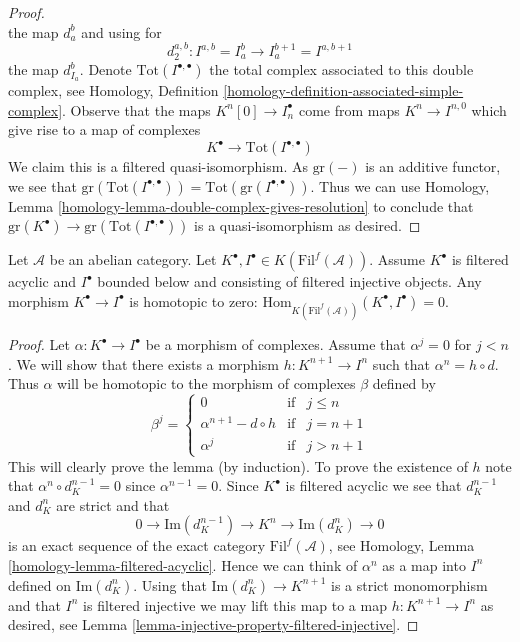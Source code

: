 \begin{proof}
$$$$
the map $d_a^b$ and using for
$$
d_2^{a, b} : I^{a, b} = I_a^b \to I_a^{b + 1} = I^{a, b + 1}
$$
the map $d_{I_a}^b$. Denote $\text{Tot}(I^{\bullet, \bullet})$
the total complex associated to this double complex, see
Homology, Definition \ref{homology-definition-associated-simple-complex}.
Observe that the maps $K^n[0] \to I_n^\bullet$ come from maps
$K^n \to I^{n, 0}$ which give rise to a map of complexes
$$
K^\bullet \longrightarrow \text{Tot}(I^{\bullet, \bullet})
$$
We claim this is a filtered quasi-isomorphism.
As $\text{gr}(-)$ is an additive functor, we see that
$\text{gr}(\text{Tot}(I^{\bullet, \bullet})) =
\text{Tot}(\text{gr}(I^{\bullet, \bullet}))$.
Thus we can use
Homology,
Lemma \ref{homology-lemma-double-complex-gives-resolution}
to conclude that
$\text{gr}(K^\bullet) \to \text{gr}(\text{Tot}(I^{\bullet, \bullet}))$
is a quasi-isomorphism as desired.
\end{proof}

\begin{lemma}
\label{lemma-filtered-acyclic-is-zero}
Let $\mathcal{A}$ be an abelian category.
Let $K^\bullet, I^\bullet \in K(\text{Fil}^f(\mathcal{A}))$.
Assume $K^\bullet$ is filtered acyclic and
$I^\bullet$ bounded below and consisting of filtered injective objects.
Any morphism $K^\bullet \to I^\bullet$ is homotopic to zero:
$\text{Hom}_{K(\text{Fil}^f(\mathcal{A}))}(K^\bullet, I^\bullet) = 0$.
\end{lemma}

\begin{proof}
Let $\alpha : K^\bullet \to I^\bullet$ be a morphism of
complexes. Assume that $\alpha^j = 0$ for $j < n$.
We will show that there exists a morphism $h : K^{n + 1} \to I^n$
such that $\alpha^n = h \circ d$. Thus $\alpha$ will be homotopic
to the morphism of complexes $\beta$ defined by
$$
\beta^j =
\left\{
\begin{matrix}
0 & \text{if} & j \leq n \\
\alpha^{n + 1} - d \circ h & \text{if} & j = n + 1 \\
\alpha^j & \text{if} & j > n + 1
\end{matrix}
\right.
$$
This will clearly prove the lemma (by induction).
To prove the existence of $h$ note that
$\alpha^n \circ d_K^{n - 1} = 0$ since
$\alpha^{n - 1} = 0$. Since $K^\bullet$ is filtered acyclic
we see that $d_K^{n - 1}$ and $d_K^n$ are strict and that
$$
0 \to \text{Im}(d_K^{n - 1}) \to K^n \to \text{Im}(d_K^n) \to 0
$$
is an exact sequence of the exact category $\text{Fil}^f(\mathcal{A})$, see
Homology, Lemma \ref{homology-lemma-filtered-acyclic}.
Hence we can think of $\alpha^n$ as a map into $I^n$ defined
on $\text{Im}(d_K^n)$.
Using that $\text{Im}(d_K^n) \to K^{n + 1}$ is a strict monomorphism
and that $I^n$ is filtered injective we may lift this map to a map
$h : K^{n + 1} \to I^n$ as desired, see
Lemma \ref{lemma-injective-property-filtered-injective}.
\end{proof}

